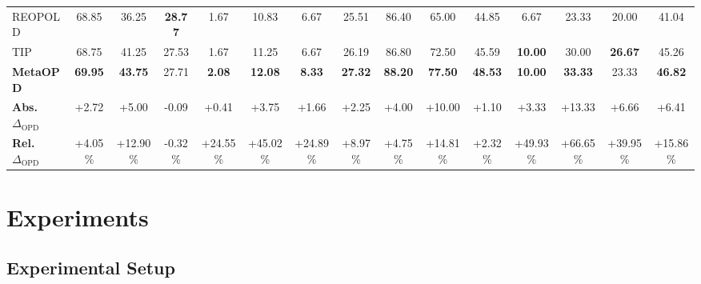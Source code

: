 \documentclass{article}
\theoremstyle{plain}
\theoremstyle{definition}
\theoremstyle{remark}
\begin{document}
\begin{table}[t]
{\begin{tabular}{@{}l*{14}{c}@{}}
REOPOLD  & 68.85 & 36.25 & \textbf{28.77} & 1.67 & 10.83 & 6.67 & 25.51 & 86.40 & 65.00 & 44.85 & 6.67 & 23.33 & 20.00 & 41.04 \\
TIP      & 68.75 & 41.25 & 27.53 & 1.67 & 11.25 & 6.67 & 26.19 & 86.80 & 72.50 & 45.59 & \textbf{10.00} & 30.00 & \textbf{26.67} & 45.26 \\
\textbf{MetaOPD} & \textbf{69.95} & \textbf{43.75} & 27.71 & \textbf{2.08} & \textbf{12.08} & \textbf{8.33} & \textbf{27.32} & \textbf{88.20} & \textbf{77.50} & \textbf{48.53} & \textbf{10.00} & \textbf{33.33} & 23.33 & \textbf{46.82} \\
\rowcolor{MetaAbsBg}
\textcolor{MetaAbsText}{\bfseries Abs. \(\Delta_{\mathrm{OPD}}\)}
& \textcolor{MetaAbsText}{+2.72} & \textcolor{MetaAbsText}{+5.00} & \textcolor{MetaAbsText}{-0.09} & \textcolor{MetaAbsText}{+0.41} & \textcolor{MetaAbsText}{+3.75} & \textcolor{MetaAbsText}{+1.66} & \textcolor{MetaAbsText}{+2.25}
& \textcolor{MetaAbsText}{+4.00} & \textcolor{MetaAbsText}{+10.00} & \textcolor{MetaAbsText}{+1.10} & \textcolor{MetaAbsText}{+3.33} & \textcolor{MetaAbsText}{+13.33} & \textcolor{MetaAbsText}{+6.66} & \textcolor{MetaAbsText}{+6.41} \\
\rowcolor{MetaRelBg}
\textcolor{MetaRelText}{\bfseries Rel. \(\Delta_{\mathrm{OPD}}\)}
& \textcolor{MetaRelText}{+4.05\%} & \textcolor{MetaRelText}{+12.90\%} & \textcolor{MetaRelText}{-0.32\%} & \textcolor{MetaRelText}{+24.55\%} & \textcolor{MetaRelText}{+45.02\%} & \textcolor{MetaRelText}{+24.89\%} & \textcolor{MetaRelText}{+8.97\%}
& \textcolor{MetaRelText}{+4.75\%} & \textcolor{MetaRelText}{+14.81\%} & \textcolor{MetaRelText}{+2.32\%} & \textcolor{MetaRelText}{+49.93\%} & \textcolor{MetaRelText}{+66.65\%} & \textcolor{MetaRelText}{+39.95\%} & \textcolor{MetaRelText}{+15.86\%} \\
\bottomrule
\end{tabular}%
}
\end{table}




\section{Experiments}
\label{sec:experiments}


\subsection{Experimental Setup}
\label{sec:experimental_setup}
\end{document}
